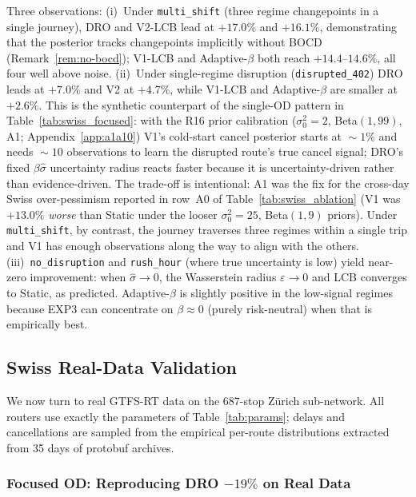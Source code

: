 \documentclass[11pt]{article}
\theoremstyle{definition}
\theoremstyle{remark}
\begin{document}
Three observations:
(i)~Under \texttt{multi\_shift} (three regime changepoints in a single
journey), DRO and V2-LCB lead at $+17.0\%$ and $+16.1\%$, demonstrating
that the posterior tracks changepoints implicitly without BOCD
(Remark~\ref{rem:no-bocd}); V1-LCB and Adaptive-$\beta$ both reach
$+14.4$--$14.6\%$, all four well above noise.
(ii)~Under single-regime disruption (\texttt{disrupted\_402}) DRO
leads at $+7.0\%$ and V2 at $+4.7\%$, while V1-LCB and Adaptive-$\beta$
are smaller at $+2.6\%$. This is the synthetic counterpart of the
single-OD pattern in Table~\ref{tab:swiss_focused}: with the R16 prior
calibration ($\sigma_0^2{=}2$, Beta$(1,99)$, A1; Appendix~\ref{app:a1a10})
V1's cold-start cancel posterior starts at $\!\sim\!1\%$ and needs
$\!\sim\!10$ observations to learn the disrupted route's true cancel
signal; DRO's fixed $\beta\hat\sigma$ uncertainty radius reacts faster
because it is uncertainty-driven rather than evidence-driven. The
trade-off is intentional: A1 was the fix for the cross-day Swiss
over-pessimism reported in row~A0 of Table~\ref{tab:swiss_ablation}
(V1 was $+13.0\%$ \emph{worse} than Static under the looser
$\sigma_0^2{=}25$, Beta$(1,9)$ priors). Under \texttt{multi\_shift}, by
contrast, the journey traverses three regimes within a single trip and
V1 has enough observations along the way to align with the others.
(iii)~\texttt{no\_disruption} and \texttt{rush\_hour} (where true
uncertainty is low) yield near-zero improvement: when $\hat\sigma\to 0$,
the Wasserstein radius $\varepsilon\to 0$ and LCB converges to Static,
as predicted. Adaptive-$\beta$ is slightly positive in the low-signal
regimes because EXP3 can concentrate on $\beta\approx 0$ (purely
risk-neutral) when that is empirically best.

\subsection{Swiss Real-Data Validation}
\label{sec:swiss-results}

We now turn to real GTFS-RT data on the 687-stop Zürich sub-network.
All routers use exactly the parameters of Table~\ref{tab:params};
delays and cancellations are sampled from the empirical per-route
distributions extracted from 35 days of protobuf archives.

\subsubsection{Focused OD: Reproducing DRO $-19\%$ on Real Data}
\end{document}
